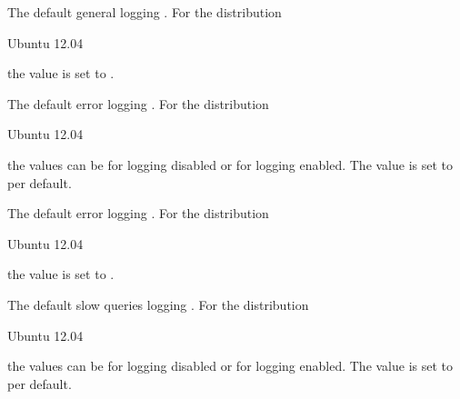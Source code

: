 The default general logging .
For the distribution
\begin{inparaitem}
\item[\TheDistribution{ubuntu}] Ubuntu 12.04
\end{inparaitem}
the value is set to .


The default error logging .
For the distribution
\begin{inparaitem}
\item[\TheDistribution{ubuntu}] Ubuntu 12.04
\end{inparaitem}
the values can be  for logging disabled or  for logging 
enabled. The value is set to  per default.


The default error logging .
For the distribution
\begin{inparaitem}
\item[\TheDistribution{ubuntu}] Ubuntu 12.04
\end{inparaitem}
the value is set to .


The default slow queries logging .
For the distribution
\begin{inparaitem}
\item[\TheDistribution{ubuntu}] Ubuntu 12.04
\end{inparaitem}
the values can be  for logging disabled or  for logging 
enabled. The value is set to  per default.



